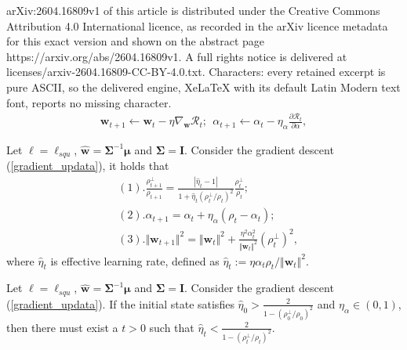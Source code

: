 \documentclass[10pt,a4paper]{amsart}
\begin{document}
arXiv:2604.16809v1 of this article is distributed under the Creative Commons Attribution 4.0 International licence, as recorded in the arXiv licence metadata for this exact version and shown on the abstract page https://arxiv.org/abs/2604.16809v1. A full rights notice is delivered at licenses/arxiv-2604.16809-CC-BY-4.0.txt. Characters: every retained excerpt is pure ASCII, so the delivered engine, XeLaTeX with its default Latin Modern text font, reports no missing character.
\begin{equation}\label{gradient_updata}
\begin{aligned}
  \mathbf{w}_{t+1} \leftarrow \mathbf{w}_{t} - \eta 
  \nabla_{\mathbf{w}} \mathcal{R}_t; \ \ 
  \alpha_{t+1} \leftarrow \alpha_{t} - \eta_{\alpha} 
  \frac{\partial \mathcal{R}_t}{\partial \alpha},
\end{aligned}
\end{equation}

\begin{lemma}\label{lemma:Dynamics_of_BN_Linear_Regression}
  Let $\ell = \ell_{squ}$, $\hat{\mathbf{w}} = \mathbf{\Sigma}^{-1} \boldsymbol{\mu}$ and $\mathbf{\Sigma} = \mathbf{I}$. 
  Consider the gradient descent (\ref{gradient_updata}), 
  it holds that 
  \begin{equation*}
  \begin{aligned}
    & (1).
    \frac{\rho_{t+1}^{\perp}}{\rho_{t+1}} = 
    \frac{|\hat{\eta}_t - 1|}{1 + \hat{\eta}_t \left({\rho_t^{\perp}}/{\rho_t}\right)^2}
    \frac{\rho_t^{\perp}}{\rho_t}; 
    \\ & (2). \alpha_{t+1}  = \alpha_t + \eta_{\alpha} \left( \rho_{t} - \alpha_t \right);
    \\ & (3). \Vert \mathbf{w}_{t+1} \Vert^2 = 
    \Vert \mathbf{w}_{t} \Vert^2
    + 
    \frac{\eta^2 \alpha_t^2}{\Vert \mathbf{w}_{t} \Vert^2} \left(\rho_t^{\perp}\right)^2,
  \end{aligned}
  \end{equation*}
  where $\hat{\eta}_t$ is effective learning rate, defined as $\hat{\eta}_{t} := {\eta \alpha_t \rho_{t}}/{\Vert \mathbf{w}_{t} \Vert^{2}}$. 
\end{lemma}

\begin{lemma}\label{Existence_of_Falling_Edge_lr}
  Let $\ell = \ell_{squ}$, $\hat{\mathbf{w}} = \mathbf{\Sigma}^{-1} \boldsymbol{\mu}$ and $\mathbf{\Sigma} = \mathbf{I}$. 
  Consider the gradient descent (\ref{gradient_updata}).
  If the initial state satisfies $\hat{\eta}_0 > \frac{2}{1 - \left(\rho_0^{\perp}/\rho_0 \right)^2}$ and $\eta_{\alpha} \in (0, 1)$, 
  then there must exist a $t > 0$ such that $\hat{\eta}_t < \frac{2}{1 - \left(\rho_t^{\perp}/\rho_t \right)^2}$.
\end{lemma}
\end{document}

